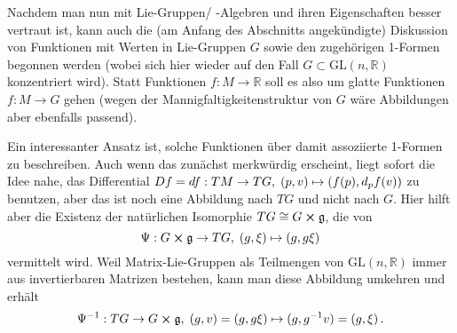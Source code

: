 \documentclass[../H_Analysis_main.tex]{subfiles}
\begin{document}
\begin{bsp}
\end{bsp}


Nachdem man nun mit Lie-Gruppen/ -Algebren und ihren Eigenschaften besser vertraut ist, kann auch die (am Anfang des Abschnitts angekündigte) Diskussion von Funktionen mit Werten in Lie-Gruppen $G$ sowie den zugehörigen 1-Formen begonnen werden (wobei sich hier wieder auf den Fall $G \subset \text{GL}(n, \mathbb{R})$ konzentriert wird). Statt Funktionen $f: M \rightarrow \mathbb{R}$ soll es also um glatte Funktionen $f: M \rightarrow G$ gehen (wegen der Mannigfaltigkeitenstruktur von $G$ wäre Abbildungen aber ebenfalls passend).


Ein interessanter Ansatz ist, solche Funktionen über damit assoziierte 1-Formen zu beschreiben. Auch wenn das zunächst merkwürdig erscheint, liegt sofort die Idee nahe, das Differential $Df = df: TM \rightarrow TG, \; (p, v) \mapsto \qty(f(p), d_p f(v))$ zu benutzen, aber das ist noch eine Abbildung nach $TG$ und nicht nach $G$. Hier hilft aber die Existenz der natürlichen Isomorphie $TG \cong G \cross \mathfrak{g}$, die von
\begin{equation*}
\Psi: G \cross \mathfrak{g} \rightarrow TG, \; (g, \xi) \mapsto (g, g \xi)
\end{equation*}
vermittelt wird. Weil Matrix-Lie-Gruppen als Teilmengen von $\text{GL}(n, \mathbb{R})$ immer aus invertierbaren Matrizen bestehen, kann man diese Abbildung umkehren und erhält
\begin{equation*}
\Psi^{-1}: TG \rightarrow G \cross \mathfrak{g}, \; (g, v) = (g, g \xi) \mapsto (g, g^{-1} v) = (g, \xi) \, .
\end{equation*}
\end{document}
